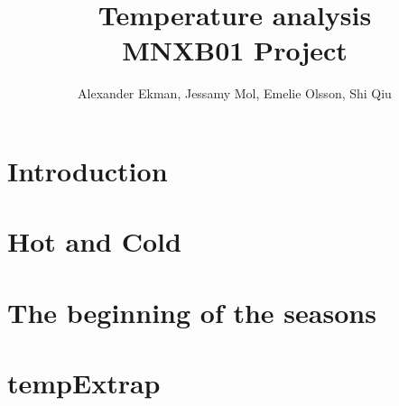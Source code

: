 \documentclass[a4paper]{article}
\title{\textbf{Temperature analysis } \\ 
\vspace{5pt}
\large MNXB01 Project}
\author{Alexander Ekman, Jessamy Mol, Emelie Olsson, Shi Qiu}
\date{ }
\begin{document}
 
 
 

\maketitle

\section{Introduction}
 


%

\section{Hot and Cold}


\section{The beginning of the seasons}


\section{tempExtrap}


\newpage


 
\end{document}
